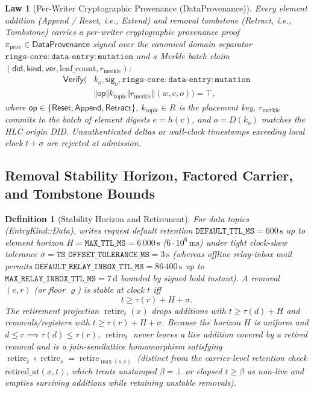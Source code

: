 \documentclass[journal]{IEEEtran}
\newtheorem{definition}{Definition}
\newtheorem{law}{Law}
\DeclareRobustCommand{\code}[1]{{\ttfamily\renewcommand{\_}{\textunderscore\allowbreak}#1}}
\begin{document}
\begin{law}[Per-Writer Cryptographic Provenance (\code{DataProvenance})]\label{law:provenance}
Every element addition (\code{Append} / \code{Reset}, i.e., \code{Extend}) and removal
tombstone (\code{Retract}, i.e., \code{Tombstone}) carries a per-writer cryptographic
provenance proof $\pi_{\mathrm{prov}}\in\mathsf{DataProvenance}$ signed over the
canonical domain separator $\mathtt{rings\mbox{-}core:data\mbox{-}entry:mutation}$
and a Merkle batch claim $(\mathsf{did},\mathsf{kind},\mathsf{ver},\mathrm{leaf\_count},r_{\mathrm{merkle}})$:
\[
\begin{aligned}
  \mathsf{Verify}\bigl(&k_o,\mathsf{sig}_o,\mathtt{rings\mbox{-}core:data\mbox{-}entry:mutation}\\
  &\Vert\mathsf{op}\Vert k_{\mathrm{topic}}\Vert r_{\mathrm{merkle}}\Vert(w,c,o)\bigr)=\top,
\end{aligned}
\]
where $\mathsf{op}\in\{\mathsf{Reset},\mathsf{Append},\mathsf{Retract}\}$, $k_{\mathrm{topic}}\in R$
is the placement key, $r_{\mathrm{merkle}}$ commits to the batch of element digests $e=h(v)$, and $o=D(k_o)$ matches the
HLC origin DID.  Unauthenticated deltas or wall-clock timestamps exceeding local clock $t+\sigma$ are
rejected at admission.
\end{law}

\subsection{Removal Stability Horizon, Factored Carrier, and Tombstone Bounds}

\begin{definition}[Stability Horizon and Retirement]\label{def:stability}
For data topics (\code{EntryKind::Data}), writes request default retention
$\mathtt{DEFAULT\_TTL\_MS}=600\,\mathrm{s}$ up to element horizon
$H=\mathtt{MAX\_TTL\_MS}=6\,000\,\mathrm{s}$ ($6\cdot 10^6\,\mathrm{ms}$) under
tight clock-skew tolerance $\sigma=\mathtt{TS\_OFFSET\_TOLERANCE\_MS}=3\,\mathrm{s}$
(whereas offline relay-inbox mail permits $\mathtt{DEFAULT\_RELAY\_INBOX\_TTL\_MS}=86\,400\,\mathrm{s}$
up to $\mathtt{MAX\_RELAY\_INBOX\_TTL\_MS}=7\,\mathrm{d}$ bounded by signed hold instant).
A removal $(e,r)$ (or floor $\varrho$) is \emph{stable} at clock $t$ iff
\[
  t\ge\tau(r)+H+\sigma.
\]
The retirement projection $\operatorname{retire}_t(x)$ drops additions with
$t\ge\tau(d)+H$ and removals/registers with $t\ge\tau(r)+H+\sigma$.
Because the horizon $H$ is uniform and $d\le r\implies\tau(d)\le\tau(r)$,
$\operatorname{retire}_t$ never leaves a live addition covered by a retired
removal and is a join-semilattice homomorphism satisfying
$\operatorname{retire}_t\circ\operatorname{retire}_s=\operatorname{retire}_{\max(s,t)}$
(distinct from the carrier-level retention check $\mathrm{retired\_at}(x,t)$, which
treats unstamped $\beta=\bot$ or elapsed $t\ge\beta$ as non-live and empties surviving additions while retaining unstable removals).
\end{definition}
\end{document}
